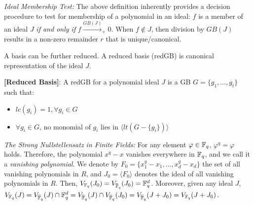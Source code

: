 {\it Ideal Membership Test:} The above definition inherently provides
a decision procedure to test for membership of a polynomial in an ideal:
$f$ is a member of an ideal $J$ {\it if and only if} 
$f\xrightarrow{GB(J)}_+0$.
When $f\notin J$,
then division by $GB(J)$ results in a non-zero remainder $r$ that is
unique/canonical. 

A \Grobner basis can be further reduced. A reduced \Grobner basis
(redGB) is canonical representation of the ideal $J$.

\begin{Definition} \label{def:rgb}
{\bf [Reduced \Grobner Basis]}:
    A redGB for a polynomial ideal $J$ is 
    a GB $G=\{g_{1},\dots,g_{t}\}$ such that:
    \begin{itemize}
        \item $lc(g_{i})=1,\forall g_{i}\in G$
        \item $\forall g_{i} \in G$, no monomial of $g_{i}$ 
        lies in $\langle lt(G-\{g_{i}\})\rangle$
    \end{itemize}
\end{Definition}


{\it The Strong Nullstellensatz in Finite Fields:}
For any element $\varphi\in{\mathbb{F}}_{q}$, $\varphi^q=\varphi$ holds. Therefore,
the polynomial $x^q-x$ vanishes everywhere in ${\mathbb{F}}_{q}$, and we call it a
{\it vanishing polynomial}. We denote by $F_0 =
\{x_1^q-x_1,\dots,x_d^q-x_d\}$ the set of all vanishing polynomials in
$R$, and  $J_0 = \langle F_0 \rangle$ denotes the ideal of all
vanishing polynomials in $R$. 
Then, $V_{{\mathbb{F}}_{q}}(J_0) =
V_{\overline{\mathbb{F}}_q}(J_0) = {\mathbb{F}}_{q}^d$. Moreover, given any ideal $J$, $V_{{\mathbb{F}}_{q}}(J) =
V_{\overline{\mathbb{F}}_q}(J) \cap{\mathbb{F}}_{q}^d = V_{\overline{\mathbb{F}}_q}(J) \cap V_{\overline{\mathbb{F}}_q}(J_0) =
V_{\overline{\mathbb{F}}_q}(J+J_0) = V_{{\mathbb{F}}_{q}}(J+J_0)$. 



